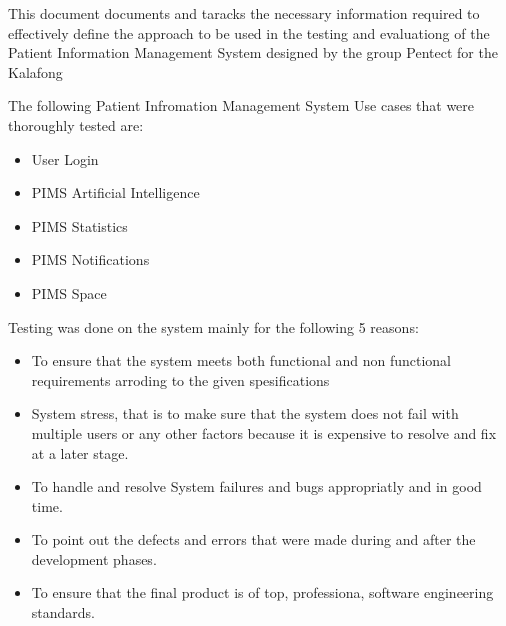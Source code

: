 This document documents and taracks the necessary information required to effectively define the approach to be used in the testing and evaluationg of the Patient Information Management System designed by the group Pentect for the Kalafong 

The following Patient Infromation Management System Use cases that were thoroughly tested are:

\begin{itemize}
	\item User Login
	\item PIMS Artificial Intelligence
	\item PIMS Statistics
	\item PIMS Notifications
	\item PIMS Space
\end{itemize}

Testing was done on the system mainly for the following 5 reasons:

\begin{itemize}
	\item To ensure that the system meets both functional and non functional requirements arroding to the given spesifications
	\item System stress, that is to make sure that the system does not fail with multiple users or any other factors because it is expensive to resolve and fix at a later stage.
	\item To handle and resolve System failures and bugs appropriatly and in good time.
	\item To point out the defects and errors that were made during and after the development phases.
	\item To ensure that the final product is of top, professiona, software engineering standards.
\end{itemize}
